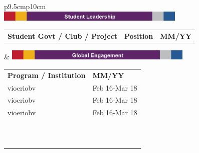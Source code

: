 \documentclass{article}
\begin{document}
\tiny
	 \begin{tabular}{p{9.5cm}p{10cm}}
	 	\\
	 	\includegraphics[width=3.55in]{StudentLeadership.png} \begin{tabular}{p{4.5cm}p{2cm}p{2cm}}
	 		\\
	 	\textbf{Student Govt / Club / Project} & \textbf{Position} & \textbf{MM/YY} \\
	 	\end{tabular} & %
 	\includegraphics[width=9cm]{GlobalEngagement.png} 
 	\begin{tabular}{p{6.5cm}p{2.5cm}}
	 	\\
	 	\textbf{Program / Institution} &  \textbf{MM/YY} \\
	 	vioeriobv & Feb 16-Mar 18 \\
	 	vioeriobv & Feb 16-Mar 18 \\
	 	vioeriobv & Feb 16-Mar 18 \\
	 	\\
	 	\\
	 	\\
	 	\\
	 	\\
	 	\\
	 	\\
	 	\\
	 	\\
	 	\\
	 	\\
	 	

\end{tabular}
\end{tabular}
\end{document}
